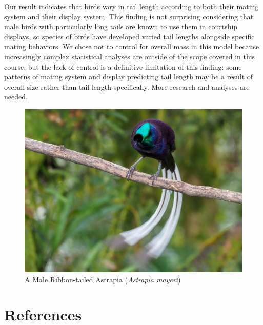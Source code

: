 \documentclass[
  12pt,
]{article}
\begin{document}
Our result indicates that birds vary in tail length according to both
their mating system and their display system. This finding is not
surprising considering that male birds with particularly long tails are
known to use them in courtship displays, so species of birds have
developed varied tail lengths alongside specific mating behaviors. We
chose not to control for overall mass in this model because increasingly
complex statistical analyses are outside of the scope covered in this
course, but the lack of control is a definitive limitation of this
finding: some patterns of mating system and display predicting tail
length may be a result of overall size rather than tail length
specifically. More research and analyses are needed.

\begin{figure}
\centering
\includegraphics{Images/ribbon-tailed_astrapia.jpeg}
\caption{A Male Ribbon-tailed Astrapia (\emph{Astrapia mayeri})}
\end{figure}

\newpage

\hypertarget{references}{%
\section{References}\label{references}}
\end{document}
